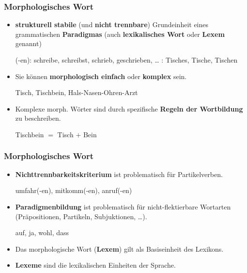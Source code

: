 \begin{frame}
\frametitle{Morphologisches Wort}

\begin{itemize}
	\item \textbf{strukturell stabile} (und \textbf{nicht trennbare}) Grundeinheit eines grammatischen \textbf{Paradigmas} (auch \textbf{lexikalisches Wort} oder \textbf{Lexem} genannt)

	\ea 
		\ea {}(-en): schreibe, schreibst, schrieb, geschrieben, \ldots 
		\ex {}: Tisches, Tische, Tischen
		\z 
	\z 

\pause 
	
	\item Sie können \textbf{morphologisch einfach} oder \textbf{komplex} sein.
	
	\ea Tisch, Tischbein, Hals-Nasen-Ohren-Arzt
	\z 

\pause 
	
	\item Komplexe morph. Wörter sind durch spezifische \textbf{Regeln der Wortbildung} zu beschreiben.
	
	\settowidth{}
	\ea Tischbein $=$ Tisch $+$ Bein \jambox{[Komposition]}
	\z 
\end{itemize}

\end{frame}


\begin{frame}
\frametitle{Morphologisches Wort}

\begin{itemize}
	\item \textbf{Nichttrennbarkeitskriterium} ist problematisch für Partikelverben.
	
	\ea umfahr(-en), mitkomm(-en), anruf(-en)
	\z 
	
	\item \textbf{Paradigmenbildung} ist problematisch für nicht-flektierbare Wortarten (Präpositionen, Partikeln, Subjuktionen, \ldots).
	
	\ea auf, ja, wohl, dass
	\z 
	
	\item Das morphologische Wort (\textbf{Lexem}) gilt als Basiseinheit des Lexikons.
	
	\item \textbf{Lexeme} sind die lexikalischen Einheiten der Sprache.
\end{itemize}

\end{frame}


